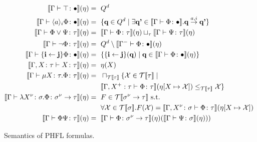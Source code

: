 \begin{figure}
    \caption{Semantics of PHFL formulas.}
    \label{figure:phfl-semantics}
    \begin{align*}
        \llbracket \Gamma \vdash \top \colon \bullet \rrbracket(\eta) =\text{ }& Q^d\\
        \llbracket \Gamma \vdash \langle a \rangle_i \Phi \colon \bullet \rrbracket(\eta) =\text{ }& \{\emph{q} \in Q^d \mid
        \exists \emph{q'} \in \llbracket \Gamma \vdash \Phi \colon \bullet \rrbracket . \emph{q}
        \overset{a, i}{\rightarrow} \emph{q'}\}\\
        \llbracket \Gamma \vdash \Phi \vee \Psi \colon \tau \rrbracket(\eta) =\text{ }& \llbracket \Gamma \vdash \Phi
        \colon \tau \rrbracket (\eta) \sqcup_\tau \llbracket \Gamma \vdash \Psi \colon \tau \rrbracket (\eta)\\
        \llbracket \Gamma \vdash \neg \Phi \colon \tau \rrbracket(\eta) =\text{ }& Q^d \setminus \llbracket \Gamma^- \vdash \Phi
        \colon \bullet \rrbracket (\eta)\\
        \llbracket \Gamma \vdash \{\emph{i} \leftarrow \emph{j}\} \Phi \colon \bullet \rrbracket(\eta) =\text{ }&
        \{\{\emph{i} \leftarrow \emph{j}\}(\emph{q}) \mid \emph{q} \in \llbracket \Gamma \vdash \Phi \colon \bullet
        \rrbracket (\eta)\}\\
        \llbracket \Gamma, X \colon \tau \vdash X \colon \tau \rrbracket(\eta) =\text{ }& \eta(X)\\
        \llbracket \Gamma \vdash \mu X \colon \tau .\Phi \colon \tau \rrbracket(\eta) =\text{ }&
        \sqcap_{\mathcal{T}\llbracket\tau\rrbracket} \{\mathcal{X} \in \mathcal{T}\llbracket \tau \rrbracket \mid \\
        &\llbracket \Gamma, X^+ : \tau \vdash \Phi \colon \tau \rrbracket(\eta[X \mapsto \mathcal{X}])
        \leq_{\mathcal{T}\llbracket \tau \rrbracket} \mathcal{X}\}\\
        \llbracket \Gamma \vdash \lambda X^\nu \colon \sigma. \Phi \colon \sigma^\nu \rightarrow \tau \rrbracket
        (\eta) =\text{ }& F \in \mathcal{T}\llbracket \sigma^\nu \rightarrow \tau \rrbracket \text{ s.t. }\\
        &\forall \mathcal{X} \in
        \mathcal{T}\llbracket \sigma \rrbracket. F(\mathcal{X}) = \llbracket \Gamma, X^\nu \colon \sigma \vdash \Phi \colon \tau
        \rrbracket (\eta[X \mapsto \mathcal{X}])\\
        \llbracket \Gamma \vdash \Phi \Psi \colon \tau \rrbracket(\eta) =\text{ }& \llbracket \Gamma \vdash \Phi \colon \sigma
        ^\nu \rightarrow \tau \rrbracket (\eta)(\llbracket \Gamma \vdash \Psi \colon \sigma \rrbracket (\eta)))
    \end{align*}
\end{figure}

